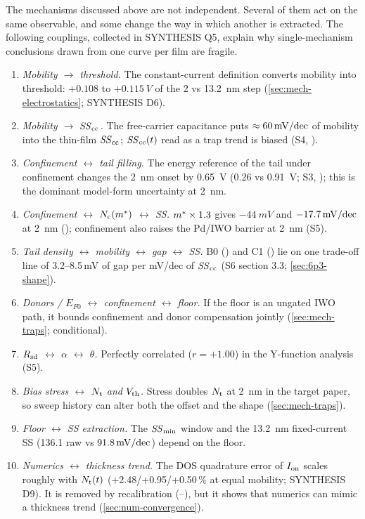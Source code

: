 The mechanisms discussed above are not independent. Several of them act on the same observable, and some change the way in which another is extracted. The following couplings, collected in SYNTHESIS Q5, explain why single-mechanism conclusions drawn from one curve per film are fragile.
\begin{enumerate}
\item \emph{Mobility $\rightarrow$ threshold.} The constant-current definition converts mobility into threshold: $+0.108$ to $+\SI{0.115}{V}$ of the 2 vs \SI{13.2}{nm} step (\cref{sec:mech-electrostatics}; SYNTHESIS D6).
\item \emph{Mobility $\rightarrow$ $\mathit{SS}_{\mathrm{cc}}$.} The free-carrier capacitance puts $\approx 60\,\mathrm{mV/dec}$ of mobility into the thin-film $\mathit{SS}_{\mathrm{cc}}$; $\mathit{SS}_{\mathrm{cc}}(t)$ read as a trap trend is biased (S4, \evSURR).
\item \emph{Confinement $\leftrightarrow$ tail filling.} The energy reference of the tail under confinement changes the \SI{2}{nm} onset by \SI{0.65}{V} (0.26 vs \SI{0.91}{V}; S3, \evSURR); this is the dominant model-form uncertainty at \SI{2}{nm}.
\item \emph{Confinement $\leftrightarrow$ $N_{\mathrm{c}}(m^{*})$ $\leftrightarrow$ SS.} $m^{*}\times1.3$ gives $-\SI{44}{mV}$ and $-17.7\,\mathrm{mV/dec}$ at \SI{2}{nm} (); confinement also raises the Pd/IWO barrier at \SI{2}{nm} (S5).
\item \emph{Tail density $\leftrightarrow$ mobility $\leftrightarrow$ gap $\leftrightarrow$ SS.} B0 () and C1 () lie on one trade-off line of 3.2--8.5\,mV of gap per mV/dec of $\mathit{SS}_{\mathrm{cc}}$ (S6 section 3.3; \cref{sec:6p3-shape}).
\item \emph{Donors / $E_{F0}$ $\leftrightarrow$ confinement $\leftrightarrow$ floor.} If the floor is an ungated IWO path, it bounds confinement and donor compensation jointly (\cref{sec:mech-traps}; conditional).
\item \emph{$R_{\mathrm{sd}}$ $\leftrightarrow$ $\alpha$ $\leftrightarrow$ $\theta$.} Perfectly correlated ($r = +1.00$) in the Y-function analysis (S5).
\item \emph{Bias stress $\leftrightarrow$ $N_{\mathrm{t}}$ and $V_{\mathrm{th}}$.} Stress doubles $N_{\mathrm{t}}$ at \SI{2}{nm} in the target paper, so sweep history can alter both the offset and the shape (\cref{sec:mech-traps}).
\item \emph{Floor $\leftrightarrow$ SS extraction.} The $\mathit{SS}_{\min}$ window and the \SI{13.2}{nm} fixed-current SS (136.1 raw vs $91.8\,\mathrm{mV/dec}$) depend on the floor.
\item \emph{Numerics $\leftrightarrow$ thickness trend.} The DOS quadrature error of $I_{\mathrm{on}}$ scales roughly with $N_{\mathrm{t}}(t)$ (+2.48/+0.95/+0.50\,\% at equal mobility; SYNTHESIS D9). It is removed by recalibration (--), but it shows that numerics can mimic a thickness trend (\cref{sec:num-convergence}).
\end{enumerate}

